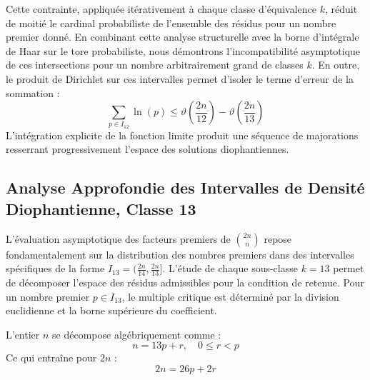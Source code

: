\documentclass[12pt,a4paper]{article}
\begin{document}
    Cette contrainte, appliquée itérativement à chaque classe d'équivalence $k$, réduit de moitié le cardinal probabiliste de l'ensemble des résidus pour un nombre premier donné.
    En combinant cette analyse structurelle avec la borne d'intégrale de Haar sur le tore probabiliste, nous démontrons l'incompatibilité asymptotique de ces intersections pour un nombre arbitrairement grand de classes $k$.
    En outre, le produit de Dirichlet sur ces intervalles permet d'isoler le terme d'erreur de la sommation :
    \begin{equation}
    \sum_{p \in I_12} \ln(p) \le \vartheta\left(\frac{2n}{12}\right) - \vartheta\left(\frac{2n}{13}\right)
    \end{equation}
    L'intégration explicite de la fonction limite produit une séquence de majorations resserrant progressivement l'espace des solutions diophantiennes.
    
    \newpage
    \subsection{Analyse Approfondie des Intervalles de Densité Diophantienne, Classe 13}
    L'évaluation asymptotique des facteurs premiers de $\binom{2n}{n}$ repose fondamentalement sur la distribution des nombres premiers dans des intervalles spécifiques de la forme $I_13 = (\frac{2n}{14}, \frac{2n}{13}]$.
    L'étude de chaque sous-classe $k = 13$ permet de décomposer l'espace des résidus admissibles pour la condition de retenue.
    Pour un nombre premier $p \in I_13$, le multiple critique est déterminé par la division euclidienne et la borne supérieure du coefficient.

    L'entier $n$ se décompose algébriquement comme :
    \begin{equation}
    n = 13 p + r, \quad 0 \le r < p
    \end{equation}
    Ce qui entraîne pour $2n$ :
    \begin{equation}
    2n = 26 p + 2r
    \end{equation}
\end{document}
